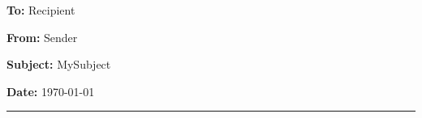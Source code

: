 \documentclass[10pt, letterpaper, final, twoside, onecolumn, article]{memoir}%
\begin{document}
\par\noindent\textbf{To:} Recipient

\par\noindent\textbf{From:} Sender

\par\noindent\textbf{Subject:} MySubject

\par\noindent\textbf{Date:} \today %

\vspace{.5pc}
\hrule
\vspace{3pc}

\lipsum[1-2]
\end{document}
